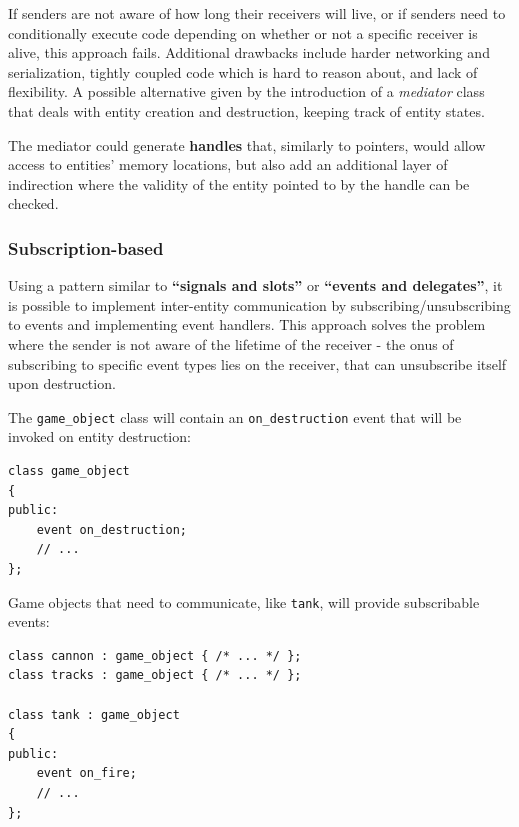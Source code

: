 \documentclass[oneside, 12pt, a4paper, openany]{book}
\begin{document}
If senders are not aware of how long their receivers will live, or if
senders need to conditionally execute code depending on whether or not a
specific receiver is alive, this approach fails. Additional drawbacks
include harder networking and serialization, tightly coupled code which
is hard to reason about, and lack of flexibility. A possible alternative
given by the introduction of a \emph{mediator} class that deals with
entity creation and destruction, keeping track of entity states.

The mediator could generate \textbf{handles} that, similarly to
pointers, would allow access to entities' memory locations, but also add
an additional layer of indirection where the validity of the entity
pointed to by the handle can be checked.

\subsubsection{Subscription-based}\label{subscription-based}

Using a pattern similar to \textbf{``signals and slots''} or
\textbf{``events and delegates''}, it is possible to implement
inter-entity communication by subscribing/unsubscribing to events and
implementing event handlers. This approach solves the problem where the
sender is not aware of the lifetime of the receiver - the onus of
subscribing to specific event types lies on the receiver, that can
unsubscribe itself upon destruction.

The
\texttt{game_object}
class will contain an
\texttt{on_destruction}
event that will be invoked on entity destruction:

\begin{verbatim}
class game_object
{
public:
    event on_destruction;
    // ...
};
\end{verbatim}

Game objects that need to communicate, like
\texttt{tank},
will provide subscribable events:

\begin{verbatim}
class cannon : game_object { /* ... */ };
class tracks : game_object { /* ... */ };

class tank : game_object
{
public:
    event on_fire;
    // ...
};
\end{verbatim}
\end{document}
